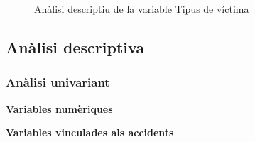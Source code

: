 \documentclass[12pt,longbibliography]{article}
\theoremstyle{definition}
\theoremstyle{remark}
\begin{document}
\begin{figure}[h!]
\par
{}%
\hfill
{}%
\par

\caption{Anàlisi descriptiu de la variable Tipus de víctima}
\label{fig:F4}
\end{figure}

\newpage


\subsection{Anàlisi descriptiva}

\subsubsection{Anàlisi univariant}

\begin{large}

\textbf{Variables numèriques}

\end{large}

\textbf{Variables vinculades als accidents}
\end{document}
